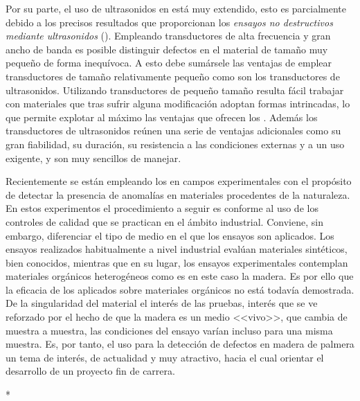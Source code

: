 Por su parte, el uso de ultrasonidos en  está muy extendido, esto
es parcialmente debido a los precisos resultados que proporcionan los
\emph{ensayos no destructivos mediante ultrasonidos} ().
Empleando transductores de alta frecuencia y gran ancho de banda es posible
distinguir defectos en el material de tamaño muy pequeño de forma
inequívoca. A esto debe sumársele las ventajas de emplear transductores de
tamaño relativamente pequeño como son los transductores de ultrasonidos.
Utilizando transductores de pequeño tamaño resulta fácil trabajar con
materiales que tras sufrir alguna modificación adoptan formas intrincadas,
lo que permite explotar al máximo las ventajas que ofrecen los .
Además los transductores de ultrasonidos reúnen una serie de ventajas
adicionales como su gran fiabilidad, su duración, su resistencia a las
condiciones externas y a un uso exigente, y son muy sencillos de
manejar.

Recientemente se están empleando los  en campos experimentales
con el propósito de detectar la presencia de anomalías en materiales
procedentes de la naturaleza. En estos experimentos el procedimiento a
seguir es conforme al uso de los controles de calidad que se practican en
el ámbito industrial. Conviene, sin embargo, diferenciar el tipo de medio
en el que los ensayos son aplicados. Los ensayos realizados habitualmente a
nivel industrial evalúan materiales sintéticos, bien conocidos, mientras
que en su lugar, los ensayos experimentales contemplan materiales orgánicos
heterogéneos como es en este caso la madera. Es por ello que la eficacia de
los  aplicados sobre materiales orgánicos no está todavía
demostrada. De la singularidad del material el interés de las pruebas,
interés que se ve reforzado por el hecho de que la madera es un medio
<<vivo>>, que cambia de muestra a muestra, las condiciones del ensayo
varían incluso para una misma muestra. Es, por tanto, el uso 
para la detección de defectos en madera de palmera un tema de interés, de
actualidad y muy atractivo, hacia el cual orientar el desarrollo de un
proyecto fin de carrera.

\smallskip\begin{center}
	*\quad*\quad*
\end{center}\smallskip


